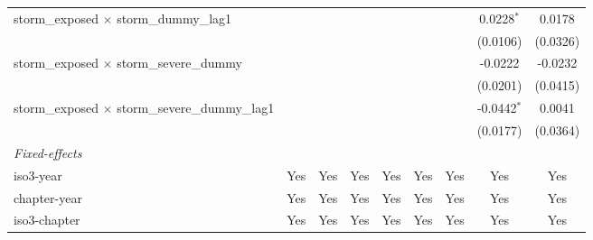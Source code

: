 \begin{tabular}{lcccccccc}
   storm\_exposed $\times$ storm\_dummy\_lag1                        &                       &                       &                       &                       &                       &                       & 0.0228$^{*}$          & 0.0178\\   
                                                                     &                       &                       &                       &                       &                       &                       & (0.0106)              & (0.0326)\\   
   storm\_exposed $\times$ storm\_severe\_dummy                      &                       &                       &                       &                       &                       &                       & -0.0222               & -0.0232\\   
                                                                     &                       &                       &                       &                       &                       &                       & (0.0201)              & (0.0415)\\   
   storm\_exposed $\times$ storm\_severe\_dummy\_lag1                &                       &                       &                       &                       &                       &                       & -0.0442$^{*}$         & 0.0041\\   
                                                                     &                       &                       &                       &                       &                       &                       & (0.0177)              & (0.0364)\\   
   \midrule
   \emph{Fixed-effects}\\
   iso3-year                                                         & Yes                   & Yes                   & Yes                   & Yes                   & Yes                   & Yes                   & Yes                   & Yes\\  
   chapter-year                                                      & Yes                   & Yes                   & Yes                   & Yes                   & Yes                   & Yes                   & Yes                   & Yes\\  
   iso3-chapter                                                      & Yes                   & Yes                   & Yes                   & Yes                   & Yes                   & Yes                   & Yes                   & Yes\\  

\end{tabular}
